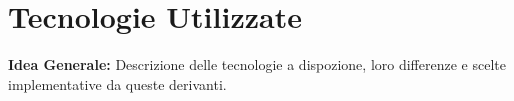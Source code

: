 \chapter{Tecnologie Utilizzate}
\textbf{Idea Generale:} Descrizione delle tecnologie a dispozione, loro differenze e scelte implementative da queste derivanti.